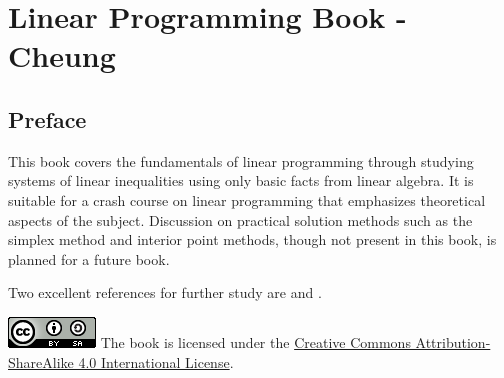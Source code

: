 %

\chapter{Linear Programming Book - Cheung}

\section*{Preface}\label{preface}

This book covers the fundamentals of linear programming through studying
systems of linear inequalities using only basic facts from linear
algebra. It is suitable for a crash course on linear programming that
emphasizes theoretical aspects of the subject. Discussion on practical
solution methods such as the simplex method and interior point methods,
though not present in this book, is planned for a future book.

Two excellent references for further study are \cite{Bertsimas:1997}
and \cite{Schrijver:1986}.

\includegraphics{images/by-sa.png} The book is licensed under the
\href{http://creativecommons.org/licenses/by-sa/4.0/}{Creative Commons
Attribution-ShareAlike 4.0 International License}.
